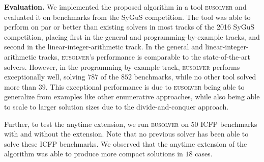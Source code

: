 \documentclass{llncs}
\newcommand\comment[1]{}
\newcommand{\sygus}{{\sffamily\fontsize{8.5}{10}\selectfont
    SyGuS}\xspace}
\renewcommand{\paragraph}[1]{\par\noindent\textbf{#1.}}
\newcommand{\eusolver}{\textsc{eusolver}\xspace}
\begin{document}
\paragraph{Evaluation}
We implemented the proposed algorithm in a tool \eusolver and
evaluated it on benchmarks from the \sygus competition.
The tool was able to perform on par or better than existing solvers in
most tracks of the 2016 \sygus competition, placing first in the general
and programming-by-example tracks, and second in the
linear-integer-arithmetic track.
In the general and linear-integer-arithmetic tracks, \eusolver's performance
is comparable to the state-of-the-art solvers.
However, in the programming-by-example track, \eusolver performs
exceptionally well, solving $787$ of the $852$ benchmarks, while no
other tool solved more than $39$.
This exceptional performance is due to \eusolver being able to
generalize from examples like other enumerative approaches, while also
being able to scale to larger solution sizes due to the
divide-and-conquer approach.

Further, to test the anytime extension, we run \eusolver on $50$ ICFP
benchmarks with and without the extension.
Note that no previous solver has been able to solve these ICFP
benchmarks.
We observed that the anytime extension of the algorithm was able to
produce more compact solutions in $18$ cases.
\comment{
We were able to obtain up to $???\%$ reduction in solution size in some
cases.
 The tool was able
to solve $47$ out of the $50$ problems in the ICFP suite of
benchmarks.  %
no other solver has been able to solve the ICFP benchmarks
satisfactorily.  Further, we also observed that the anytime extension
of the algorithm was able to produce more compact solutions in $19$ of
the $47$ solved benchmarks.  We were able to obtain up to $90\%$
reduction in solution size in some cases.  In the linear integer
arithmetic domain, the tool performed much better than existing
black-box solvers, scaling to larger instances. The algorithm was also
competitive with the white-box solvers for small to medium sized
benchmarks. However, for larger benchmarks, the performance was worse,
and the solution size was slightly larger than those produced by
white-box solvers due to the shortcomings of the decision tree
learning algorithm.
}
\end{document}
